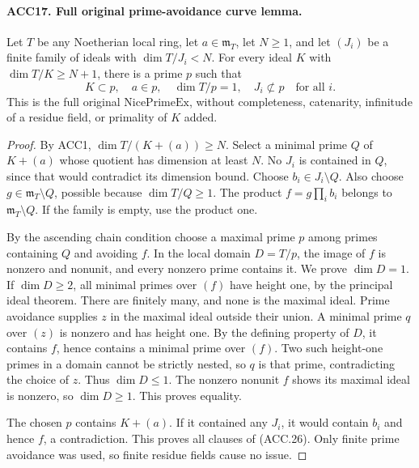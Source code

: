 \documentclass[11pt,a4paper]{article}
\numberwithin{equation}{section}
\theoremstyle{remark}\newtheorem{remark}[theorem]{Remark}
\begin{document}
\paragraph{ACC17. Full original prime-avoidance curve lemma.}
\label{claim:ACC17}
Let \(T\) be any Noetherian local ring, let \(a\in\mathfrak m_T\),
let \(N\ge1\), and let \((J_i)\) be a finite family of ideals
with \(\dim T/J_i<N\).  For every ideal \(K\) with
\(\dim T/K\ge N+1\), there is a prime \(p\) such that
\[
 K\subset p,\quad a\in p,\quad \dim T/p=1,
                     \quad J_i\not\subset p\quad\text{for all }i.
                                                               \tag{ACC.26}
\]
This is the full original \(\mathrm{NicePrimeEx}\), without
completeness, catenarity, infinitude of a residue field, or primality
of \(K\) added.

\begin{proof}
By ACC1, \(\dim T/(K+(a))\ge N\).  Select a minimal prime
\(Q\) of \(K+(a)\) whose quotient has dimension at least \(N\).
No \(J_i\) is contained in \(Q\), since that would contradict
its dimension bound.  Choose \(b_i\in J_i\setminus Q\).
Also choose \(g\in\mathfrak m_T\setminus Q\), possible because
\(\dim T/Q\ge1\).  The product \(f=g\prod_i b_i\) belongs
to \(\mathfrak m_T\setminus Q\).  If the family is empty, use
the product one.

By the ascending chain condition choose a maximal prime \(p\)
among primes containing \(Q\) and avoiding \(f\).  In the local
domain \(D=T/p\), the image of \(f\) is nonzero and nonunit,
and every nonzero prime contains it.  We prove \(\dim D=1\).
If \(\dim D\ge2\), all minimal primes over \((f)\) have
height one, by the principal ideal theorem.  There are finitely
many, and none is the maximal ideal.  Prime avoidance supplies
\(z\) in the maximal ideal outside their union.  A minimal prime
\(q\) over \((z)\) is nonzero and has height one.  By the
defining property of \(D\), it contains \(f\), hence contains
a minimal prime over \((f)\).  Two such height-one primes in
a domain cannot be strictly nested, so \(q\) is that prime,
contradicting the choice of \(z\).  Thus \(\dim D\le1\).
The nonzero nonunit \(f\) shows its maximal ideal is nonzero,
so \(\dim D\ge1\).  This proves equality.

The chosen \(p\) contains \(K+(a)\).  If it contained any
\(J_i\), it would contain \(b_i\) and hence \(f\), a
contradiction.  This proves all clauses of (ACC.26).  Only finite
prime avoidance was used, so finite residue fields cause no issue.
\end{proof}
\end{document}
